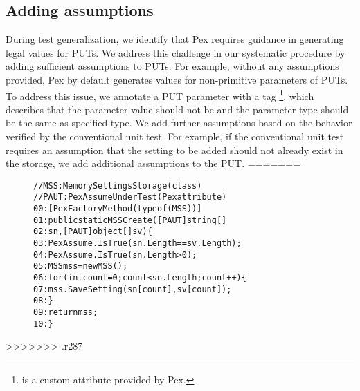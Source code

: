 \subsection{Adding assumptions} During test generalization, we identify that Pex requires guidance in generating legal values for PUTs. We address this challenge in our systematic procedure by adding sufficient assumptions to PUTs. For example, without any assumptions provided, Pex by default generates  values for non-primitive parameters of PUTs. To address this issue, we annotate a PUT parameter with a tag \footnote{ is a custom attribute provided by Pex.}, which describes that the parameter value should not be  and the parameter type should be the same as specified type. We add further assumptions based on the behavior verified by the conventional unit test. For example, if the conventional unit test requires an assumption that the setting to be added should not already exist in the storage, we add additional assumptions to the PUT.
=======
\begin{figure}[t]
\begin{CodeOut}
\begin{alltt}
//MSS: MemorySettingsStorage (class)
//PAUT: PexAssumeUnderTest	(Pex attribute)
00:[PexFactoryMethod(typeof(MSS))]
01:public static MSS Create([PAUT]string[] 
02:\hspace*{0.3in}sn, [PAUT]object[] sv) \{
03:\hspace*{0.2in}PexAssume.IsTrue(sn.Length == sv.Length);
04:\hspace*{0.2in}PexAssume.IsTrue(sn.Length > 0);
05:\hspace*{0.2in}MSS mss = new MSS();
06:\hspace*{0.2in}for (int count = 0; count < sn.Length; count++) \{
07:\hspace*{0.3in}mss.SaveSetting(sn[count], sv[count]);
08:\hspace*{0.2in}\}
09:\hspace*{0.2in}return mss;
10:\}
\end{alltt}
\end{CodeOut}\vspace*{-4ex}
\vspace*{-4ex}
\end{figure}

>>>>>>> .r287

